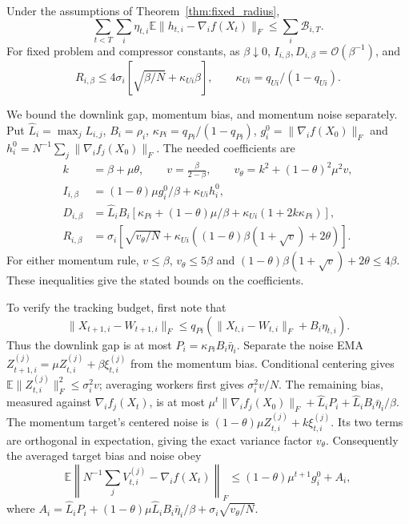 \begin{codex}
\begin{lemma}\label{lem:radius_tracking}
Under the assumptions of Theorem~\ref{thm:fixed_radius},
\begin{equation}\label{eq:radius_tracking}
 \sum_{t<T}\sum_i\eta_{t,i}\mathbb E\|h_{t,i}-\nabla_i f(X_t)\|_F
 \le\sum_i\mathcal B_{i,T}.
\end{equation}
For fixed problem and compressor constants, as $\beta\downarrow0$,
$I_{i,\beta},D_{i,\beta}=\mathcal O(\beta^{-1})$, and
\[
 R_{i,\beta}\le4\sigma_i
       \left[\sqrt{\beta/N}+\kappa_{Ui}\beta\right],\qquad
 \kappa_{Ui}=q_{Ui}/(1-q_{Ui}).
\]
\end{lemma}
\begin{paperproof}
We bound the downlink gap, momentum bias, and momentum noise separately.
Put $\widehat L_i=\max_jL_{i,j}$, $B_i=\rho_i$,
$\kappa_{Pi}=q_{Pi}/(1-q_{Pi})$,
$g_i^0=\|\nabla_i f(X_0)\|_F$ and
$h_i^0=N^{-1}\sum_j\|\nabla_i f_j(X_0)\|_F$. The needed coefficients are
\begin{align*}
 k&=\beta+\mu\theta,\qquad v=\frac{\beta}{2-\beta},\qquad
 v_\theta=k^2+(1-\theta)^2\mu^2v,\\
 I_{i,\beta}&=(1-\theta)\mu g_i^0/\beta+\kappa_{Ui}h_i^0,\\
 D_{i,\beta}&=\widehat L_iB_i
   [\kappa_{Pi}+(1-\theta)\mu/\beta
                        +\kappa_{Ui}(1+2k\kappa_{Pi})],\\
 R_{i,\beta}&=\sigma_i
   [\sqrt{v_\theta/N}
      +\kappa_{Ui}((1-\theta)\beta(1+\sqrt v)+2\theta)].
\end{align*}
For either momentum rule, $v\le\beta$, $v_\theta\le5\beta$ and
$(1-\theta)\beta(1+\sqrt v)+2\theta\le4\beta$.
These inequalities give the stated bounds on the coefficients.

To verify the tracking budget, first note that
\[
 \|X_{t+1,i}-W_{t+1,i}\|_F
 \le q_{Pi}(\|X_{t,i}-W_{t,i}\|_F+B_i\eta_{t,i}).
\]
Thus the downlink gap is at most
$P_i=\kappa_{Pi}B_i\bar\eta_i$.
Separate the noise EMA
$Z_{t+1,i}^{(j)}=\mu Z_{t,i}^{(j)}+\beta\xi_{t,i}^{(j)}$
from the momentum bias. Conditional centering gives
$\mathbb E\|Z_{t,i}^{(j)}\|_F^2\le\sigma_i^2v$;
averaging workers first gives $\sigma_i^2v/N$.
The remaining bias, measured against $\nabla_i f_j(X_t)$, is at most
$\mu^t\|\nabla_i f_j(X_0)\|_F+
 \widehat L_iP_i+\widehat L_iB_i\bar\eta_i/\beta$.
The momentum target's centered noise is
$(1-\theta)\mu Z_{t,i}^{(j)}+k\xi_{t,i}^{(j)}$.
Its two terms are orthogonal in expectation, giving the exact variance
factor $v_\theta$. Consequently the averaged target bias and noise obey
\[
 \mathbb E\left\|N^{-1}\sum_jV_{t,i}^{(j)}-\nabla_i f(X_t)\right\|_F
 \le(1-\theta)\mu^{t+1}g_i^0+A_i,
\]
where $A_i=\widehat L_iP_i+
(1-\theta)\mu\widehat L_iB_i\bar\eta_i/\beta
+\sigma_i\sqrt{v_\theta/N}$.


\end{paperproof}
\end{codex}
